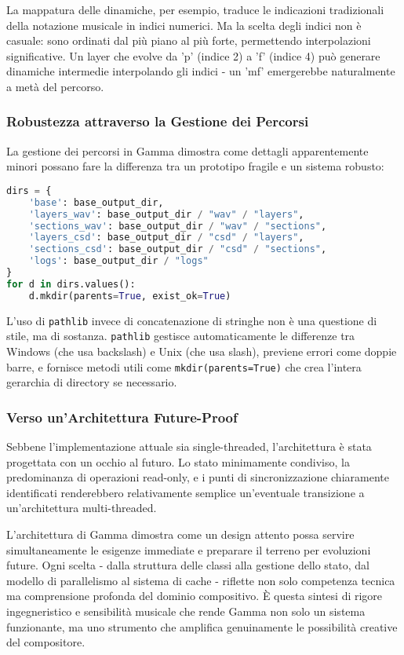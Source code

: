 La mappatura delle dinamiche, per esempio, traduce le indicazioni tradizionali della notazione musicale in indici numerici. Ma la scelta degli indici non è casuale: sono ordinati dal più piano al più forte, permettendo interpolazioni significative. Un layer che evolve da 'p' (indice 2) a 'f' (indice 4) può generare dinamiche intermedie interpolando gli indici - un 'mf' emergerebbe naturalmente a metà del percorso.
\subsubsection{Robustezza attraverso la Gestione dei Percorsi}
La gestione dei percorsi in Gamma dimostra come dettagli apparentemente minori possano fare la differenza tra un prototipo fragile e un sistema robusto:

\begin{lstlisting}[language=Python]
dirs = {
    'base': base_output_dir,
    'layers_wav': base_output_dir / "wav" / "layers",
    'sections_wav': base_output_dir / "wav" / "sections",
    'layers_csd': base_output_dir / "csd" / "layers",
    'sections_csd': base_output_dir / "csd" / "sections",
    'logs': base_output_dir / "logs"
}
for d in dirs.values():
    d.mkdir(parents=True, exist_ok=True)
\end{lstlisting}

L'uso di \texttt{pathlib} invece di concatenazione di stringhe non è una questione di stile, ma di sostanza. \texttt{pathlib} gestisce automaticamente le differenze tra Windows (che usa backslash) e Unix (che usa slash), previene errori come doppie barre, e fornisce metodi utili come \texttt{mkdir(parents=True)} che crea l'intera gerarchia di directory se necessario.
\subsubsection{Verso un'Architettura Future-Proof}
Sebbene l'implementazione attuale sia single-threaded, l'architettura è stata progettata con un occhio al futuro. Lo stato minimamente condiviso, la predominanza di operazioni read-only, e i punti di sincronizzazione chiaramente identificati renderebbero relativamente semplice un'eventuale transizione a un'architettura multi-threaded.

L'architettura di Gamma dimostra come un design attento possa servire simultaneamente le esigenze immediate e preparare il terreno per evoluzioni future. Ogni scelta - dalla struttura delle classi alla gestione dello stato, dal modello di parallelismo al sistema di cache - riflette non solo competenza tecnica ma comprensione profonda del dominio compositivo. È questa sintesi di rigore ingegneristico e sensibilità musicale che rende Gamma non solo un sistema funzionante, ma uno strumento che amplifica genuinamente le possibilità creative del compositore.